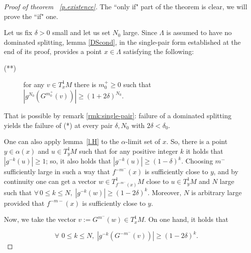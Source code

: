 \documentclass[a4paper,11pt]{article}
\newtheorem{lemma}{Lemma}
\theoremstyle{definition}
\def\La{\Lambda}
\def\de{\delta}
\def\La{\Lambda}
\begin{document}

\begin{proof}[Proof of theorem ~\ref{p.existence}]




The ``only if" part of the theorem is clear, we will prove the ``if" one.

\medskip
 Let us fix $\delta>0$ small and let us set $N_0$  large. Since
$\La$ is assumed to have no dominated splitting, lemma \ref{DScond}, in
the single-pair form established at the end of its proof,
provides a point $x\in\Lambda$ satisfying the following:

\begin{description}
\item[(**)]
for  any $v\in T^1_xM$
there is $m^+_0\geq 0$ such that $|g^{N_0}(G^{m^+_0}(v))|\geq (1+2\delta)^{N_0}$.
\end{description}
That is possible by remark \ref{rmk:single-pair}: failure of a dominated splitting yields the failure of (*) at every pair $\delta,N_0$ with $2\delta<\delta_0$.

One can also apply lemma~\ref{l.H} to the $\alpha$-limit set of $x$. So, there is a point $y\in \alpha(x)$ and $u\in T_y^1M$ such that for any positive integer $k$ it holds that $|g^{-k}(u)|\geq 1$; so, it also holds that   $|g^{-k}(u)|\geq (1-\de)^k$. Choosing $m^-$ sufficiently large in such a way that $f^{-m^-}(x)$ is sufficiently close to $y$,  and by continuity  one can get a vector $w\in T^1_{f^{-m^-}(x)}M$ close to $u\in T^1_yM$  and $N$ large such that $\forall\, 0\leq k\leq N,\; |g^{-k}(w)|\geq (1-2\delta)^k.$ Moreover, $N$ is arbitrary large provided that $f^{-m-}(x)$ is sufficiently close to $y.$

Now, we take the vector $v:=G^{m^-}(w)\in T^1_xM$. On one hand, it holds that

\begin{equation}\label{e.negative}
\forall\,\, 0\leq k\leq N,\; |g^{-k}(G^{-m^-}(v))|\geq (1-2\delta)^k.
\end{equation}


\end{proof}
\end{document}
